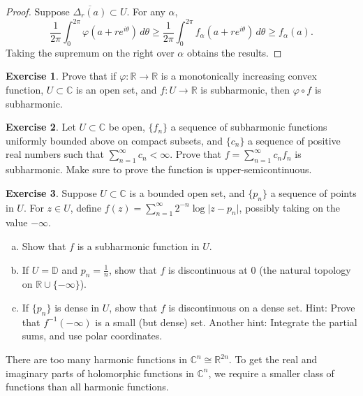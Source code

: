 \documentclass[12pt,openany]{book}
\newcommand{\sabs}[1]{\lvert {#1} \rvert}
\newcommand{\C}{{\mathbb{C}}}
\newcommand{\R}{{\mathbb{R}}}
\newcommand{\D}{{\mathbb{D}}}
\theoremstyle{plain}
\theoremstyle{remark}
\theoremstyle{definition}
\newenvironment{exbox}{%
    \def\FrameCommand{\vrule width 1pt \relax\hspace{10pt}}%
    \MakeFramed {\advance \hsize -\width \FrameRestore}%
}{%
    \endMakeFramed
}
\newenvironment{exparts}{%
    \leavevmode\begin{enumerate}[a),noitemsep,topsep=0pt,parsep=0pt,partopsep=0pt]
}{%
    \end{enumerate}
}
\theoremstyle{exercise}
\newtheorem{exercise}{Exercise}[section]
\theoremstyle{example}
\begin{document}
\begin{proof}
Suppose $\overline{\Delta_r(a)} \subset U$.  For any $\alpha$,
\begin{equation*}
\frac{1}{2\pi} \int_0^{2\pi} \varphi (a+re^{i\theta})\, d\theta 
\geq
\frac{1}{2\pi} \int_0^{2\pi} f_\alpha (a+re^{i\theta})\, d\theta 
\geq f_\alpha(a) .
\end{equation*}
Taking the supremum on the right over $\alpha$ obtains the results.
\end{proof}

\begin{exbox}
\begin{exercise}
Prove that if $\varphi \colon \R \to \R$ is a monotonically increasing
convex function, $U \subset \C$ is an open set, and $f \colon U \to \R$
is subharmonic, then $\varphi \circ f$ is subharmonic.
\end{exercise}

\begin{exercise}
Let $U \subset \C$ be open, $\{ f_n \}$ a sequence of 
subharmonic functions uniformly bounded above on compact subsets, and 
$\{ c_n \}$ a sequence of positive real numbers such that
$\sum_{n=1}^\infty c_n < \infty$.
Prove that $f = \sum_{n=1}^\infty c_n f_n$ is subharmonic.  Make sure to prove
the function is upper-semicontinuous.
\end{exercise}

\begin{exercise}
\pagebreak[2]
Suppose $U \subset \C$ is a bounded open set, and $\{ p_n \}$ a sequence of points in
$U$. For $z \in U$, define
$f(z) = \sum_{n=1}^\infty 2^{-n} \log \sabs{z-p_n}$, possibly taking on the
value $-\infty$.
\begin{exparts}
\item
Show that $f$ is a subharmonic function in $U$.
\item
If $U = \D$ and $p_n = \frac{1}{n}$, show that $f$ is discontinuous at 0
(the natural topology on $\R \cup \{ -\infty \}$).
\item
If $\{ p_n \}$ is dense in $U$, show that $f$ 
is discontinuous on a dense set.
Hint: Prove that $f^{-1}(-\infty)$ is a small (but dense) set.
Another hint: Integrate the partial sums, and use polar coordinates.
\pagebreak[2]
\end{exparts}
\end{exercise}
\end{exbox}

There are too many harmonic functions in $\C^n \cong \R^{2n}$.
To get the real and imaginary parts of holomorphic functions in $\C^n$,
we require a smaller class of functions than all harmonic functions.
\end{document}
